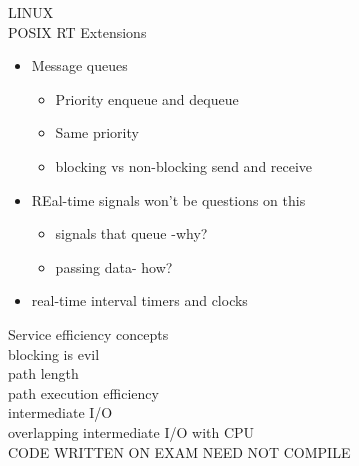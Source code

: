 \documentclass{article}
\begin{document}
LINUX\\
POSIX RT Extensions
\begin{itemize}
    \item Message queues
        \begin{itemize}
            \item Priority enqueue and dequeue
            \item Same priority
            \item blocking vs non-blocking send and receive
        \end{itemize}
    \item REal-time signals won't be questions on this
        \begin{itemize}
            \item signals that queue -why?
            \item passing data- how?
        \end{itemize}
    \item real-time interval timers and clocks
\end{itemize}

Service efficiency concepts\\
blocking is evil\\
path length\\
path execution efficiency\\
intermediate I/O\\
overlapping intermediate I/O with CPU\\

CODE WRITTEN ON EXAM NEED NOT COMPILE\\
\end{document}
